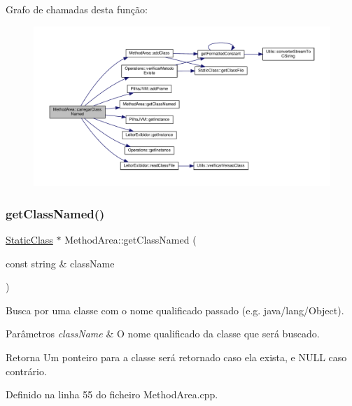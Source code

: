 Grafo de chamadas desta função\+:
\nopagebreak
\begin{figure}[H]
\begin{center}
\leavevmode
\includegraphics[width=350pt]{classMethodArea_a6e5cd27f3133d70a8c56c5daf9190ba6_cgraph}
\end{center}
\end{figure}
\mbox{\label{classMethodArea_a1fb65cf5f35cadbe2be8ad1aece57025}} 
\subsubsection{\texorpdfstring{get\+Class\+Named()}{getClassNamed()}}
{\footnotesize\ttfamily \hyperlink{classStaticClass}{Static\+Class} $\ast$ Method\+Area\+::get\+Class\+Named (\begin{DoxyParamCaption}\item[{const string \&}]{class\+Name }\end{DoxyParamCaption})}



Busca por uma classe com o nome qualificado passado (e.\+g. java/lang/\+Object). 


\begin{DoxyParams}{Parâmetros}
{\em class\+Name} & O nome qualificado da classe que será buscado. \\
\hline
\end{DoxyParams}
\begin{DoxyReturn}{Retorna}
Um ponteiro para a classe será retornado caso ela exista, e {\ttfamily N\+U\+LL} caso contrário. 
\end{DoxyReturn}


Definido na linha 55 do ficheiro Method\+Area.\+cpp.



